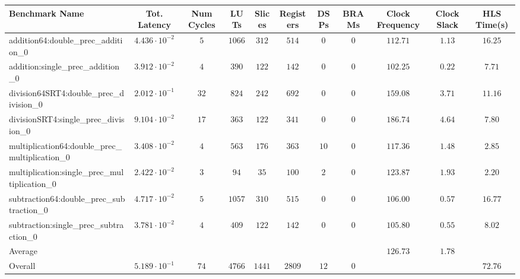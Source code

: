 \begin{tabular}{|l|c|c|c|c|c|c|c|c|c|c|}
\hline
Benchmark Name                                   & Tot. Latency            & Num Cycles & LUTs     & Slices   & Registers & DSPs   & BRAMs & Clock Frequency & Clock Slack & HLS Time(s) \\
\hline
addition64:double\_prec\_addition\_0             & $ 4.436 \cdot 10^{-2} $ & $ 5      $ & $ 1066 $ & $ 312  $ & $ 514   $ & $ 0  $ & $ 0 $ & $ 112.71      $ & $ 1.13    $ & $ 16.25   $ \\
addition:single\_prec\_addition\_0               & $ 3.912 \cdot 10^{-2} $ & $ 4      $ & $ 390  $ & $ 122  $ & $ 142   $ & $ 0  $ & $ 0 $ & $ 102.25      $ & $ 0.22    $ & $ 7.71    $ \\
division64SRT4:double\_prec\_division\_0         & $ 2.012 \cdot 10^{-1} $ & $ 32     $ & $ 824  $ & $ 242  $ & $ 692   $ & $ 0  $ & $ 0 $ & $ 159.08      $ & $ 3.71    $ & $ 11.16   $ \\
divisionSRT4:single\_prec\_division\_0           & $ 9.104 \cdot 10^{-2} $ & $ 17     $ & $ 363  $ & $ 122  $ & $ 341   $ & $ 0  $ & $ 0 $ & $ 186.74      $ & $ 4.64    $ & $ 7.80    $ \\
multiplication64:double\_prec\_multiplication\_0 & $ 3.408 \cdot 10^{-2} $ & $ 4      $ & $ 563  $ & $ 176  $ & $ 363   $ & $ 10 $ & $ 0 $ & $ 117.36      $ & $ 1.48    $ & $ 2.85    $ \\
multiplication:single\_prec\_multiplication\_0   & $ 2.422 \cdot 10^{-2} $ & $ 3      $ & $ 94   $ & $ 35   $ & $ 100   $ & $ 2  $ & $ 0 $ & $ 123.87      $ & $ 1.93    $ & $ 2.20    $ \\
subtraction64:double\_prec\_subtraction\_0       & $ 4.717 \cdot 10^{-2} $ & $ 5      $ & $ 1057 $ & $ 310  $ & $ 515   $ & $ 0  $ & $ 0 $ & $ 106.00      $ & $ 0.57    $ & $ 16.77   $ \\
subtraction:single\_prec\_subtraction\_0         & $ 3.781 \cdot 10^{-2} $ & $ 4      $ & $ 409  $ & $ 122  $ & $ 142   $ & $ 0  $ & $ 0 $ & $ 105.80      $ & $ 0.55    $ & $ 8.02    $ \\
\hline
Average                                          & $                     $ & $        $ & $      $ & $      $ & $       $ & $    $ & $   $ & $ 126.73      $ & $ 1.78    $ & $         $ \\
\hline
Overall                                          & $ 5.189 \cdot 10^{-1} $ & $ 74     $ & $ 4766 $ & $ 1441 $ & $ 2809  $ & $ 12 $ & $ 0 $ & $             $ & $         $ & $ 72.76   $ \\
\hline
\end{tabular}
